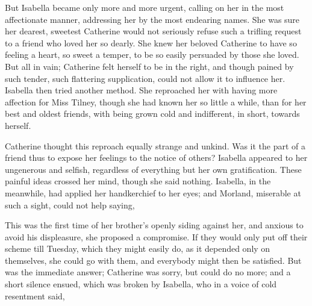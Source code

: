  But Isabella became only more and more urgent, calling on her in the most affectionate manner, addressing her by the most endearing names. She was sure her dearest, sweetest Catherine would not seriously refuse such a trifling request to a friend who loved her so dearly. She knew her beloved Catherine to have so feeling a heart, so sweet a temper, to be so easily persuaded by those she loved. But all in vain; Catherine felt herself to be in the right, and though pained by such tender, such flattering supplication, could not allow it to influence her. Isabella then tried another method. She reproached her with having more affection for Miss Tilney, though she had known her so little a while, than for her best and oldest friends, with being grown cold and indifferent, in short, towards herself. 

Catherine thought this reproach equally strange and unkind. Was it the part of a friend thus to expose her feelings to the notice of others? Isabella appeared to her ungenerous and selfish, regardless of everything but her own gratification. These painful ideas crossed her mind, though she said nothing. Isabella, in the meanwhile, had applied her handkerchief to her eyes; and Morland, miserable at such a sight, could not help saying, 

This was the first time of her brother's openly siding against her, and anxious to avoid his displeasure, she proposed a compromise. If they would only put off their scheme till Tuesday, which they might easily do, as it depended only on themselves, she could go with them, and everybody might then be satisfied. But  was the immediate answer;  Catherine was sorry, but could do no more; and a short silence ensued, which was broken by Isabella, who in a voice of cold resentment said, 

